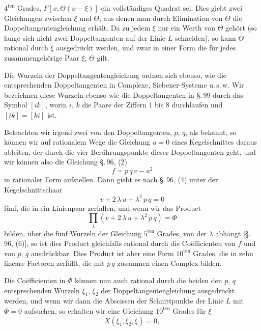 $4^{\text{ten}}$ Grades, $F[x, \Theta(x-\xi)]$ ein vollständiges Quadrat sei. Dies giebt zwei Gleichungen zwischen $\xi$ und $\Theta$, aus denen man durch Elimination von $\Theta$ die Doppeltangentengleichung erhält. Da zu jedem $\xi$ nur ein Werth von $\Theta$ gehört (so lange sich nicht zwei Doppeltangenten auf der Linie $L$ schneiden), so kann $\Theta$ rational durch $\xi$ ausgedrückt werden, und zwar in einer Form
die für jedes zusammengehörige Paar $\xi$, $\Theta$ gilt.

Die Wurzeln der Doppeltangentengleichung ordnen sich ebenso, wie die entsprechenden Doppeltangenten in Complexe, Siebener-Systeme u.\,s.\,w. Wir bezeichnen diese Wurzeln ebenso wie die Doppeltangenten in \S.\,99 durch das Symbol $[ik]$, worin $i$, $k$ die Paare der Ziffern 1 bis 8 durchlaufen und $[ik] = [ki]$ ist.

Betrachten wir irgend zwei von den Doppeltangenten, $p$, $q$, als bekannt, so können wir auf rationalem Wege die Gleichung $u = 0$ eines Kegelschnittes daraus ableiten, der durch die vier Berührungspunkte dieser Doppeltangenten geht, und wir können also die Gleichung \S.\,96, (2)
\[
f = p\,q\,v - u^2
\]
in rationaler Form aufstellen. Dann giebt es nach \S.\,96, (4) unter der Kegelschnittschaar
\[
v + 2\,\lambda\,u + \lambda^2\,p\,q = 0
\]
fünf, die in ein Linienpaar zerfallen, und wenn wir das Product
\[
\prod_{\lambda} (v + 2\,\lambda\,u + \lambda^2\,p\,q) = \Phi
\]
bilden, über die fünf Wurzeln der Gleichung $5^{\text{ten}}$ Grades, von der $\lambda$ abhängt [\S.\,96, (6)], so ist dies Product gleichfalls rational durch die Co\"efficienten von $f$ und von $p$, $q$ ausdrückbar. Dies Product ist aber eine Form $10^{\text{ten}}$ Grades, die in zehn lineare Factoren zerfällt, die mit $p\,q$ zusammen einen  Complex bilden.

Die Co\"efficienten in $\Phi$ können nun auch rational durch die beiden den $p$, $q$ entsprechenden Wurzeln $\xi_1$, $\xi_2$ der Doppeltangentengleichung ausgedrückt werden, und wenn wir dann die Abscissen der Schnittpunkte der Linie $L$ mit $\Phi = 0$ aufsuchen, so erhalten wir eine Gleichung $10^{\text{ten}}$ Grades für $\xi$
\[
X(\xi_1, \xi_2, \xi) = 0,
\]
